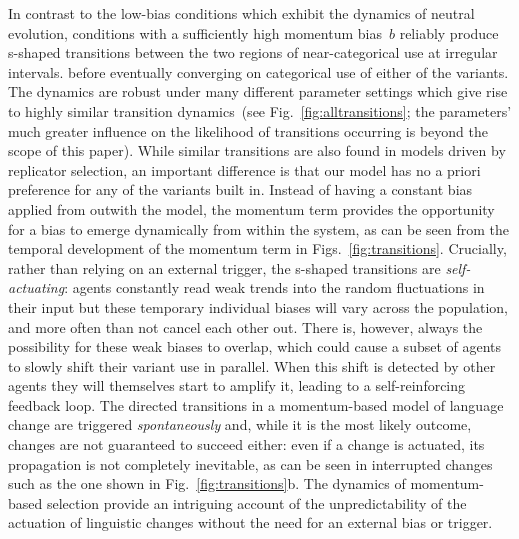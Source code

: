 \documentclass[10pt]{article}
\begin{document}
In contrast to the low-bias conditions which exhibit the dynamics of neutral evolution, conditions with a sufficiently high momentum bias~$b$ reliably produce s-shaped transitions between the two regions of near-categorical use at irregular intervals.
before eventually converging on categorical use of either of the variants. The dynamics are robust under many different parameter settings which give rise to highly similar transition dynamics~(see Fig.~\ref{fig:alltransitions}; the parameters' much greater influence on the likelihood of transitions occurring is beyond the scope of this paper). While similar transitions are also found in models driven by replicator selection, an important difference is that our model has no a priori preference for any of the variants built in. Instead of having a constant bias applied from outwith the model, the momentum term provides the opportunity for a bias to emerge dynamically from within the system, as can be seen from the temporal development of the momentum term in Figs.~\ref{fig:transitions}. Crucially, rather than relying on an external trigger, the s-shaped transitions are \emph{self-actuating}: agents constantly read weak trends into the random fluctuations in their input but these temporary individual biases will vary across the population, and more often than not cancel each other out. There is, however, always the possibility for these weak biases to overlap, which could cause a subset of agents to slowly shift their variant use in parallel. When this shift is detected by other agents they will themselves start to amplify it, leading to a self-reinforcing feedback loop. The directed transitions in a momentum-based model of language change are triggered \emph{spontaneously} and, while it is the most likely outcome, changes are not guaranteed to succeed either: even if a change is actuated, its propagation is not completely inevitable, as can be seen in interrupted changes such as the one shown in Fig.~\ref{fig:transitions}b. The dynamics of momentum-based selection provide an intriguing account of the unpredictability of the actuation of linguistic changes without the need for an external bias or trigger.
\end{document}
